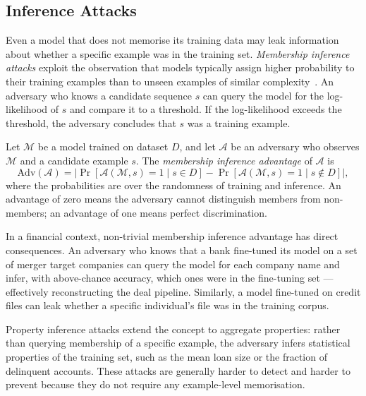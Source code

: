 \subsection{Inference Attacks}
\label{sec:ch15-inference-attacks}

Even a model that does not memorise its training data may leak information about whether a specific example was in the training set. \emph{Membership inference attacks} exploit the observation that models typically assign higher probability to their training examples than to unseen examples of similar complexity~\citep{shokri2017membership}. An adversary who knows a candidate sequence $s$ can query the model for the log-likelihood of $s$ and compare it to a threshold. If the log-likelihood exceeds the threshold, the adversary concludes that $s$ was a training example.

\begin{definition}
\label{def:mia-advantage}
Let $\mathcal{M}$ be a model trained on dataset $D$, and let $\mathcal{A}$ be an adversary who observes $\mathcal{M}$ and a candidate example $s$. The \emph{membership inference advantage} of $\mathcal{A}$ is
\begin{equation}
  \label{eq:ch15-mia}
  \mathrm{Adv}(\mathcal{A}) = \bigl|\Pr[\mathcal{A}(\mathcal{M}, s) = 1 \mid s \in D]
    - \Pr[\mathcal{A}(\mathcal{M}, s) = 1 \mid s \notin D]\bigr|,
\end{equation}
where the probabilities are over the randomness of training and inference. An advantage of zero means the adversary cannot distinguish members from non-members; an advantage of one means perfect discrimination.
\end{definition}

In a financial context, non-trivial membership inference advantage has direct consequences. An adversary who knows that a bank fine-tuned its model on a set of merger target companies can query the model for each company name and infer, with above-chance accuracy, which ones were in the fine-tuning set — effectively reconstructing the deal pipeline. Similarly, a model fine-tuned on credit files can leak whether a specific individual's file was in the training corpus.

Property inference attacks extend the concept to aggregate properties: rather than querying membership of a specific example, the adversary infers statistical properties of the training set, such as the mean loan size or the fraction of delinquent accounts. These attacks are generally harder to detect and harder to prevent because they do not require any example-level memorisation.

